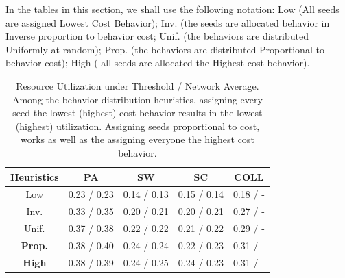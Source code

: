 \documentclass[letterpaper]{article}
\theoremstyle{plain} 		\newtheorem{thm}{Theorem}[section]
\theoremstyle{definition} 	\newtheorem{defn}[thm]{Definition}
\theoremstyle{remark}		\newtheorem{rem}{Remark}
\begin{document}
In the tables in this section, we shall use the following notation: Low (All seeds are assigned Lowest Cost Behavior); Inv. (the seeds are allocated behavior in Inverse proportion to behavior cost; Unif. (the behaviors are distributed Uniformly at random); Prop. (the behaviors are distributed Proportional to behavior cost); High ( all seeds are allocated the Highest cost behavior).

\begin{table}[htb]\footnotesize
\centering
\caption{Resource Utilization under Threshold / Network Average.  Among the behavior distribution heuristics, assigning every seed the lowest (highest) cost behavior results in the lowest (highest) utilization. Assigning seeds proportional to cost, works as well as the assigning everyone the highest cost behavior.  }\label{tab:behav-util-threshold}
    \begin{tabular}{ccccc} \toprule
        Heuristics & PA & SW & SC & COLL \\ \midrule
        Low & 0.23 / 0.23 & 0.14 / 0.13& 0.15 / 0.14 & 0.18 / -\\
        Inv.  & 0.33 / 0.35 & 0.20 / 0.21& 0.20 / 0.21& 0.27 / -\\
        Unif. & 0.37 / 0.38 & 0.22 / 0.22 & 0.21 / 0.22& 0.29 / -\\
        \textbf{Prop.} & 0.38  / 0.40 & 0.24 / 0.24 & 0.22 / 0.23& 0.31 / -\\
        \textbf{High} & 0.38 / 0.39 & 0.24 / 0.25 & 0.24 / 0.23& 0.31 / -\\ \bottomrule  
    \end{tabular}
\end{table}


\end{document}
